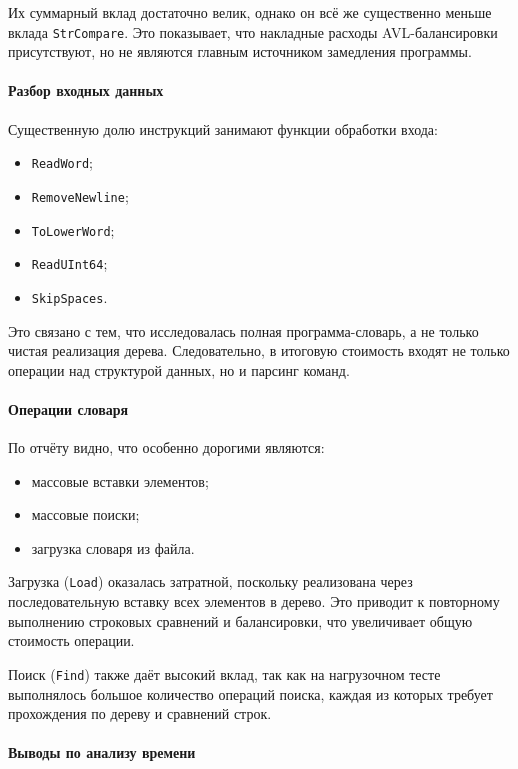 \documentclass[12pt]{article}
\begin{document}
Их суммарный вклад достаточно велик, однако он всё же существенно меньше вклада \texttt{StrCompare}. Это показывает, что накладные расходы AVL-балансировки присутствуют, но не являются главным источником замедления программы.

\paragraph{Разбор входных данных}

Существенную долю инструкций занимают функции обработки входа:
\begin{itemize}
	\item \texttt{ReadWord};
	\item \texttt{RemoveNewline};
	\item \texttt{ToLowerWord};
	\item \texttt{ReadUInt64};
	\item \texttt{SkipSpaces}.
\end{itemize}

Это связано с тем, что исследовалась полная программа-словарь, а не только чистая реализация дерева. Следовательно, в итоговую стоимость входят не только операции над структурой данных, но и парсинг команд.

\paragraph{Операции словаря}

По отчёту видно, что особенно дорогими являются:
\begin{itemize}
	\item массовые вставки элементов;
	\item массовые поиски;
	\item загрузка словаря из файла.
\end{itemize}

Загрузка (\texttt{Load}) оказалась затратной, поскольку реализована через последовательную вставку всех элементов в дерево. Это приводит к повторному выполнению строковых сравнений и балансировки, что увеличивает общую стоимость операции.

Поиск (\texttt{Find}) также даёт высокий вклад, так как на нагрузочном тесте выполнялось большое количество операций поиска, каждая из которых требует прохождения по дереву и сравнений строк.

\paragraph{Выводы по анализу времени}
\end{document}
